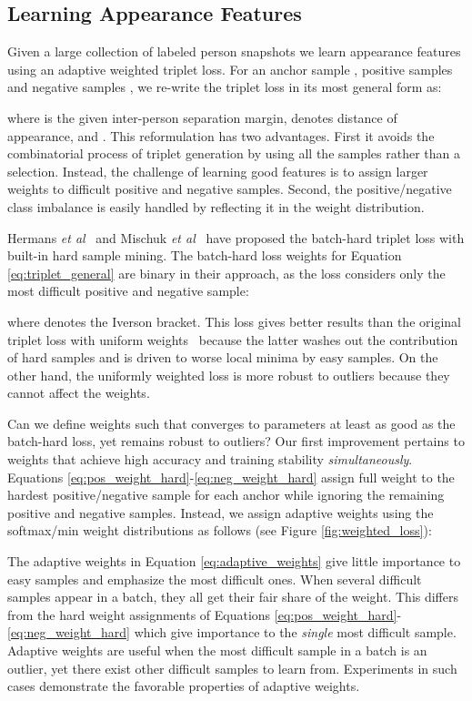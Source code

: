 \documentclass[10pt,twocolumn,letterpaper]{article}
\begin{document}
\subsection{Learning Appearance Features} 

Given a large collection of labeled person snapshots we learn appearance features using an adaptive weighted triplet loss. For an anchor sample , positive samples  and negative samples , we re-write the triplet loss in its most general form as:



where  is the given inter-person separation margin,  denotes distance of appearance, and . This reformulation has two advantages. First it avoids the combinatorial process of triplet generation by using all the samples rather than a selection. Instead, the challenge of learning good features is to assign larger weights to difficult positive and negative samples. Second, the positive/negative class imbalance is easily handled by reflecting it in the weight distribution.

Hermans \emph{et al}~\cite{hermans2017defense} and Mischuk \emph{et al}~\cite{mishchuk2017working} have proposed the batch-hard triplet loss with built-in hard sample mining. The batch-hard loss weights for Equation \ref{eq:triplet_general} are binary in their approach, as the loss considers only the most difficult positive and negative sample:




where  denotes the Iverson bracket. This loss gives better results than the original triplet loss with uniform weights~\cite{schroff2015facenet} because the latter washes out the contribution of hard samples and is driven to worse local minima by easy samples. On the other hand, the uniformly weighted loss is more robust to outliers because they cannot affect the weights. 

Can we define weights such that  converges to parameters at least as good as the batch-hard loss, yet remains robust to outliers? Our first improvement pertains to weights that achieve high accuracy and training stability \emph{simultaneously}.  Equations \ref{eq:pos_weight_hard}-\ref{eq:neg_weight_hard} assign full weight to the hardest positive/negative sample for each anchor while ignoring the remaining positive and negative samples. Instead, we assign adaptive weights using the softmax/min weight distributions as follows (see Figure \ref{fig:weighted_loss}):



The adaptive weights in Equation \ref{eq:adaptive_weights} give little importance to easy samples and emphasize the most difficult ones. When several difficult samples appear in a batch, they all get their fair share of the weight. This differs from the hard weight assignments of Equations \ref{eq:pos_weight_hard}-\ref{eq:neg_weight_hard} which give importance to the \emph{single} most difficult sample. Adaptive weights are useful when the most difficult sample in a batch is an outlier, yet there exist other difficult samples to learn from. Experiments in such cases demonstrate the favorable properties of adaptive weights.
\end{document}
